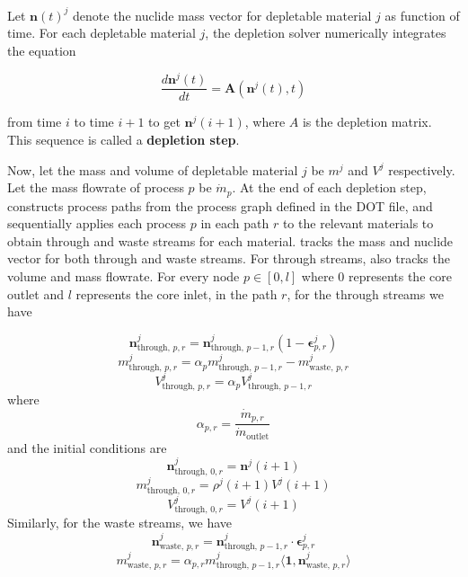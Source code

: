 Let $\mathbf{n}(t)^{j}$ denote the nuclide mass vector for depletable material
$j$ as function of time. For each depletable material $j$, the depletion
solver numerically integrates the equation

\begin{equation}
    \frac{d\mathbf{n}^{j}(t)}{dt} = \mathbf{A}(\mathbf{n}^{j}(t), t)
\end{equation}

from time $i$ to time $i+1$ to get $\mathbf{n}^{j}(i+1)$, where $A$ is the
depletion matrix. This sequence is called a {\bf depletion step}.

Now, let the mass and volume of depletable material $j$ be
$m^{j}$ and $V^{j}$ respectively. Let the mass flowrate of process $p$ be
$\dot{m}_{p}$. At the end of each depletion step, \SaltProc constructs process
paths from the process graph defined in the DOT file, and sequentially applies
each process $p$ in each path $r$ to the relevant materials to obtain through
and waste streams for each material. \SaltProc tracks the mass and nuclide vector for both through and waste streams. For through
streams, \SaltProc also tracks the volume and mass flowrate. For every node
$p\in[0,l]$ where $0$ represents the core outlet and $l$ represents the core
inlet, in the path $r$, for the through streams we have

\begin{equation}
    \mathbf{n}^{j}_{\text{through, }p,r} = \mathbf{n}^{j}_{\text{through, }p-1,r} (1 - \pmb{\epsilon}^{j}_{p,r})
\end{equation}
\begin{equation}
    m^{j}_{\text{through, } p,r} = \alpha_{p} m^{j}_{\text{through, }p-1,r} - m^{j}_{\text{waste, }p,r}
\end{equation}
\begin{equation}
    V^{j}_{\text{through, }p,r} = \alpha_{p}V^{j}_{\text{through, }p-1,r}
\end{equation}
where 
\begin{equation}
    \alpha_{p,r} = \frac{\dot{m}_{p,r}}{\dot{m}_{\text{outlet}}}
\end{equation}
and the initial conditions are 
\begin{equation}
    \mathbf{n}^{j}_{\text{through, }0,r} = \mathbf{n}^{j}(i+1)
\end{equation}
\begin{equation}
    m^{j}_{\text{through, }0,r} = \rho^{j}(i+1)V^{j}(i+1)
\end{equation}
\begin{equation}
    V^{j}_{\text{through, }0,r} = V^{j}(i+1)
\end{equation}
Similarly, for the waste streams, we have
\begin{equation}
    \mathbf{n}^{j}_{\text{waste, }p,r} = \mathbf{n}^{j}_{\text{through, }p-1,r} \cdot \pmb{\epsilon}^{j}_{p,r}
\end{equation}
\begin{equation}
    m^{j}_{\text{waste, }p,r} = \alpha_{p,r} m^{j}_{\text{through, }p-1,r} \langle\mathbf{1},\mathbf{n}^{j}_{\text{waste, }p,r}\rangle
\end{equation}

